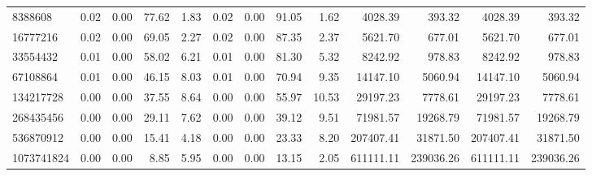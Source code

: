 \begin{tabular}{lrrrrrrrrrrrr}
8388608 & 0.02 & 0.00 & 77.62 & 1.83 & 0.02 & 0.00 & 91.05 & 1.62 & 4028.39 & 393.32 & 4028.39 & 393.32 \\
16777216 & 0.02 & 0.00 & 69.05 & 2.27 & 0.02 & 0.00 & 87.35 & 2.37 & 5621.70 & 677.01 & 5621.70 & 677.01 \\
33554432 & 0.01 & 0.00 & 58.02 & 6.21 & 0.01 & 0.00 & 81.30 & 5.32 & 8242.92 & 978.83 & 8242.92 & 978.83 \\
67108864 & 0.01 & 0.00 & 46.15 & 8.03 & 0.01 & 0.00 & 70.94 & 9.35 & 14147.10 & 5060.94 & 14147.10 & 5060.94 \\
134217728 & 0.00 & 0.00 & 37.55 & 8.64 & 0.00 & 0.00 & 55.97 & 10.53 & 29197.23 & 7778.61 & 29197.23 & 7778.61 \\
268435456 & 0.00 & 0.00 & 29.11 & 7.62 & 0.00 & 0.00 & 39.12 & 9.51 & 71981.57 & 19268.79 & 71981.57 & 19268.79 \\
536870912 & 0.00 & 0.00 & 15.41 & 4.18 & 0.00 & 0.00 & 23.33 & 8.20 & 207407.41 & 31871.50 & 207407.41 & 31871.50 \\
1073741824 & 0.00 & 0.00 & 8.85 & 5.95 & 0.00 & 0.00 & 13.15 & 2.05 & 611111.11 & 239036.26 & 611111.11 & 239036.26 \\
\bottomrule
\end{tabular}

